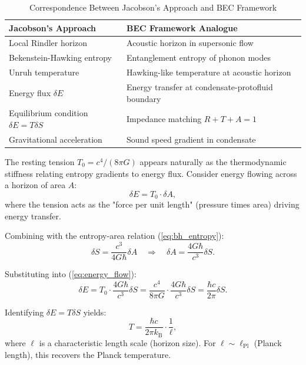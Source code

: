 \documentclass[11pt,a4paper]{article}
\newcommand{\kB}{\ensuremath{k_{\mathrm{B}}}}
\newcommand{\lPl}{\ensuremath{\ell_{\mathrm{Pl}}}}
\newcommand{\Tzero}{\ensuremath{T_0}}
\theoremstyle{definition}
\theoremstyle{remark}
\begin{document}
\begin{table}[H]
\centering
\caption{Correspondence Between Jacobson's Approach and BEC Framework}
\label{tab:jacobson_bec}
\begin{tabular}{@{}ll@{}}
\toprule
\textbf{Jacobson's Approach} & \textbf{BEC Framework Analogue} \\
\midrule
Local Rindler horizon & Acoustic horizon in supersonic flow \\
Bekenstein-Hawking entropy & Entanglement entropy of phonon modes \\
Unruh temperature & Hawking-like temperature at acoustic horizon \\
Energy flux $\delta E$ & Energy transfer at condensate-protofluid boundary \\
Equilibrium condition $\delta E = T \delta S$ & Impedance matching $R + T + A = 1$ \\
Gravitational acceleration & Sound speed gradient in condensate \\
\bottomrule
\end{tabular}
\end{table}

The resting tension $\Tzero = c^4/(8\pi G)$ appears naturally as the thermodynamic stiffness relating entropy gradients to energy flux. Consider energy flowing across a horizon of area $A$:
\begin{equation}
\label{eq:energy_flow}
\delta E = \Tzero \cdot \delta A,
\end{equation}
where the tension acts as the "force per unit length" (pressure times area) driving energy transfer.

Combining with the entropy-area relation (\ref{eq:bh_entropy}):
\begin{equation}
\delta S = \frac{c^3}{4G\hbar} \delta A \quad \Rightarrow \quad \delta A = \frac{4G\hbar}{c^3} \delta S.
\end{equation}

Substituting into (\ref{eq:energy_flow}):
\begin{equation}
\delta E = \Tzero \cdot \frac{4G\hbar}{c^3} \delta S = \frac{c^4}{8\pi G} \cdot \frac{4G\hbar}{c^3} \delta S = \frac{\hbar c}{2\pi} \delta S.
\end{equation}

Identifying $\delta E = T \delta S$ yields:
\begin{equation}
\label{eq:temperature_bec}
T = \frac{\hbar c}{2\pi \kB} \cdot \frac{1}{\ell},
\end{equation}
where $\ell$ is a characteristic length scale (horizon size). For $\ell \sim \lPl$ (Planck length), this recovers the Planck temperature.
\end{document}

